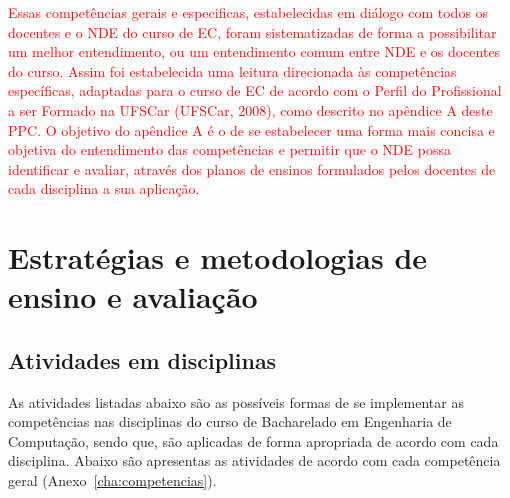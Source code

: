 \textcolor{red}{Essas competências gerais e especificas, estabelecidas em diálogo com todos os docentes e o NDE do curso de EC, foram sistematizadas de forma a possibilitar um melhor entendimento, ou um entendimento comum entre NDE e os docentes do curso. Assim foi estabelecida uma leitura direcionada às competências específicas, adaptadas para o curso de EC de acordo com o Perfil do Profissional a ser Formado na UFSCar (UFSCar, 2008), como descrito no apêndice A deste PPC. O objetivo do apêndice A é o de se estabelecer uma forma mais concisa e objetiva do entendimento das competências e permitir que o NDE possa identificar e avaliar, através dos planos de ensinos formulados pelos docentes de cada disciplina a sua aplicação.}



\section{Estratégias e metodologias de ensino e avaliação}\label{sec:estrategias-e-metodologias-de-ensino-e-avaliacao}

\subsection{Atividades em disciplinas}\label{sec:atividades-em-disciplinas}


As atividades listadas abaixo são as possíveis formas de se implementar as competências nas disciplinas do curso de Bacharelado em Engenharia de Computação, sendo que, são aplicadas de forma apropriada de acordo com cada disciplina. Abaixo são apresentas as atividades de acordo com cada competência geral (Anexo~\ref{cha:competencias}).
                         



